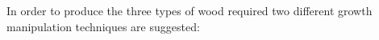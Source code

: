 In order to produce the three types of wood required two different growth
manipulation techniques are suggested: